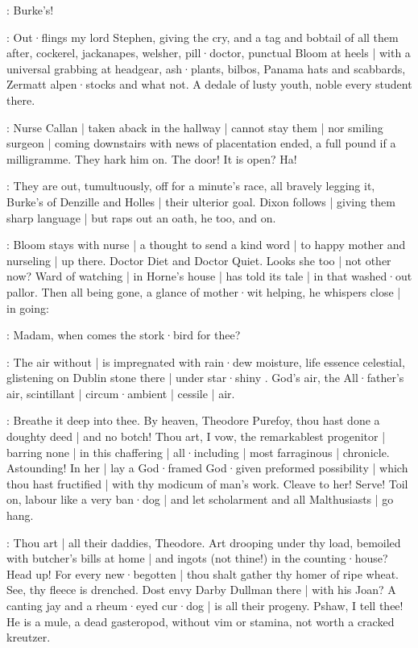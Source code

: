 
\stephen:
Burke's!

:
Out·flings my lord Stephen,
giving the cry,
and a tag and bobtail
of all them after,
cockerel,
jackanapes,
welsher,
pill·doctor,
punctual Bloom at heels |
with a universal grabbing at headgear,
ash·plants,
bilbos,
Panama hats and scabbards,
Zermatt alpen·stocks and what not.
A dedale of lusty youth,
noble every student there.

:
Nurse Callan |
taken aback in the hallway |
cannot stay them |
nor smiling surgeon |
coming downstairs with news of placentation ended,
a full pound if a milligramme.
They hark him on.
The door!
It is open?
Ha!

:
They are out,
tumultuously,
off for a minute's race,
all bravely legging it,
Burke's of Denzille and Holles |
their ulterior goal.
Dixon follows |
giving them sharp language |
but raps out an oath,
he too,
and on.

:
Bloom stays with nurse |
a thought to send a kind word |
to happy mother and nurseling |
up there.
Doctor Diet and Doctor Quiet.
Looks she too |
not other now?
Ward of watching |
in Horne's house |
has told its tale |
in that washed·out pallor.
Then all being gone,
a glance of mother·wit helping,
he whispers close |
in going:

\Bloom:
Madam,
when comes the stork·bird for thee?

:
The air without |
is impregnated with rain·dew moisture,
life essence celestial,
glistening on Dublin stone there |
under star·shiny .
God's air,
the All·father's air,
scintillant |
circum·ambient |
cessile |
air.

:
Breathe it deep into thee.
By heaven,
Theodore Purefoy,
thou hast done a doughty deed |
and no botch!
Thou art,
I vow,
the remarkablest progenitor |
barring none |
in this chaffering |
all·including |
most farraginous |
chronicle.
Astounding!
In her |
lay a God·framed God·given preformed possibility |
which thou hast fructified |
with thy modicum of man's work.
Cleave to her!
Serve!
Toil on,
labour like a very ban·dog |
and let scholarment and all Malthusiasts |
go hang.

:
Thou art |
all their daddies,
Theodore.
Art drooping under thy load,
bemoiled with butcher's bills at home |
and ingots
(not thine!)
in the counting·house?
Head up!
For every new·begotten |
thou shalt gather thy homer of ripe wheat.
See,
thy fleece is drenched.
Dost envy Darby Dullman there |
with his Joan?
A canting jay and a rheum·eyed cur·dog |
is all their progeny.
Pshaw,
I tell thee!
He is a mule,
a dead gasteropod,
without vim or stamina,
not worth a cracked kreutzer.

